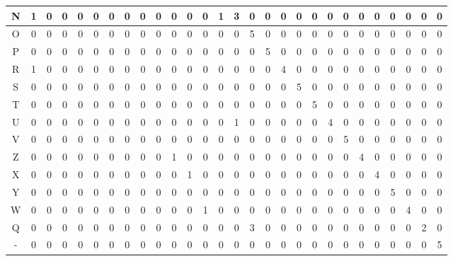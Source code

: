 \begin{table}[]
\begin{tabular}{c|c|c|c|c|c|c|c|c|c|c|c|c|c|c|c|c|c|c|c|c|c|c|c|c|c|c|c}
N & 1 & 0 & 0 & 0 & 0 & 0 & 0 & 0 & 0 & 0 & 0 & 0 & 1 & 3 & 0 & 0 & 0 & 0 & 0 & 0 & 0 & 0 & 0 & 0 & 0 & 0 & 0 \\ \hline
O & 0 & 0 & 0 & 0 & 0 & 0 & 0 & 0 & 0 & 0 & 0 & 0 & 0 & 0 & 5 & 0 & 0 & 0 & 0 & 0 & 0 & 0 & 0 & 0 & 0 & 0 & 0 \\ \hline
P & 0 & 0 & 0 & 0 & 0 & 0 & 0 & 0 & 0 & 0 & 0 & 0 & 0 & 0 & 0 & 5 & 0 & 0 & 0 & 0 & 0 & 0 & 0 & 0 & 0 & 0 & 0 \\ \hline
R & 1 & 0 & 0 & 0 & 0 & 0 & 0 & 0 & 0 & 0 & 0 & 0 & 0 & 0 & 0 & 0 & 4 & 0 & 0 & 0 & 0 & 0 & 0 & 0 & 0 & 0 & 0 \\ \hline
S & 0 & 0 & 0 & 0 & 0 & 0 & 0 & 0 & 0 & 0 & 0 & 0 & 0 & 0 & 0 & 0 & 0 & 5 & 0 & 0 & 0 & 0 & 0 & 0 & 0 & 0 & 0 \\ \hline
T & 0 & 0 & 0 & 0 & 0 & 0 & 0 & 0 & 0 & 0 & 0 & 0 & 0 & 0 & 0 & 0 & 0 & 0 & 5 & 0 & 0 & 0 & 0 & 0 & 0 & 0 & 0 \\ \hline
U & 0 & 0 & 0 & 0 & 0 & 0 & 0 & 0 & 0 & 0 & 0 & 0 & 0 & 1 & 0 & 0 & 0 & 0 & 0 & 4 & 0 & 0 & 0 & 0 & 0 & 0 & 0 \\ \hline
V & 0 & 0 & 0 & 0 & 0 & 0 & 0 & 0 & 0 & 0 & 0 & 0 & 0 & 0 & 0 & 0 & 0 & 0 & 0 & 0 & 5 & 0 & 0 & 0 & 0 & 0 & 0 \\ \hline
Z & 0 & 0 & 0 & 0 & 0 & 0 & 0 & 0 & 0 & 1 & 0 & 0 & 0 & 0 & 0 & 0 & 0 & 0 & 0 & 0 & 0 & 4 & 0 & 0 & 0 & 0 & 0 \\ \hline
X & 0 & 0 & 0 & 0 & 0 & 0 & 0 & 0 & 0 & 0 & 1 & 0 & 0 & 0 & 0 & 0 & 0 & 0 & 0 & 0 & 0 & 0 & 4 & 0 & 0 & 0 & 0 \\ \hline
Y & 0 & 0 & 0 & 0 & 0 & 0 & 0 & 0 & 0 & 0 & 0 & 0 & 0 & 0 & 0 & 0 & 0 & 0 & 0 & 0 & 0 & 0 & 0 & 5 & 0 & 0 & 0 \\ \hline
W & 0 & 0 & 0 & 0 & 0 & 0 & 0 & 0 & 0 & 0 & 0 & 1 & 0 & 0 & 0 & 0 & 0 & 0 & 0 & 0 & 0 & 0 & 0 & 0 & 4 & 0 & 0 \\ \hline
Q & 0 & 0 & 0 & 0 & 0 & 0 & 0 & 0 & 0 & 0 & 0 & 0 & 0 & 0 & 3 & 0 & 0 & 0 & 0 & 0 & 0 & 0 & 0 & 0 & 0 & 2 & 0 \\ \hline
- & 0 & 0 & 0 & 0 & 0 & 0 & 0 & 0 & 0 & 0 & 0 & 0 & 0 & 0 & 0 & 0 & 0 & 0 & 0 & 0 & 0 & 0 & 0 & 0 & 0 & 0 & 5 \\ \hline
\end{tabular}
\end{table}